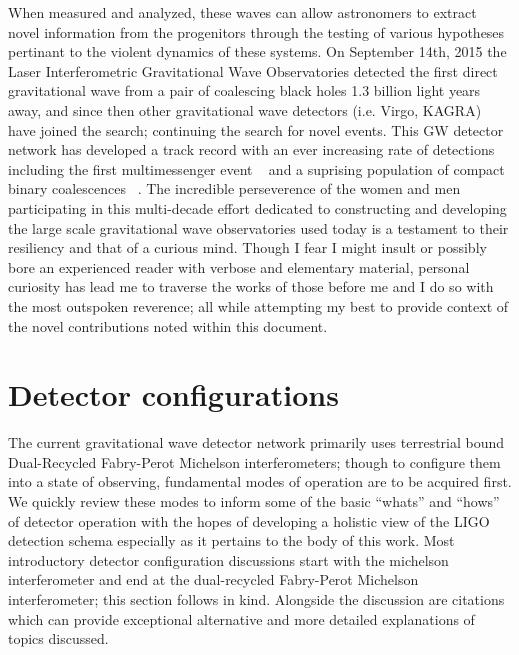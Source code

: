 When measured and analyzed, these waves can allow astronomers to extract novel information from the progenitors through the testing of various hypotheses pertinant to the violent dynamics of these systems. On September 14th, 2015 the Laser Interferometric Gravitational Wave Observatories detected the first direct gravitational wave from a pair of coalescing black holes 1.3 billion light years away, and since then other gravitational wave detectors (i.e. Virgo, KAGRA) have joined the search; continuing the search for novel events. This GW detector network has developed a track record with an ever increasing rate of detections including the first multimessenger event ~\cite{gw170817} and a suprising population of compact binary coalescences ~\cite{Nitz_2023}. The incredible perseverence of the women and men participating in this multi-decade effort dedicated to constructing and developing the large scale gravitational wave observatories used today is a testament to their resiliency and that of a curious mind. Though I fear I might insult or possibly bore an experienced reader with verbose and elementary material, personal curiosity has lead me to traverse the works of those before me and I do so with the most outspoken reverence; all while attempting my best to provide context of the novel contributions noted within this document. 

\newpage

\section{Detector configurations}
The current gravitational wave detector network primarily uses terrestrial bound Dual-Recycled Fabry-Perot Michelson interferometers; though to configure them into a state of observing, fundamental modes of operation are to be acquired first. We quickly review these modes to inform some of the basic ``whats'' and ``hows'' of detector operation with the hopes of developing a holistic view of the LIGO detection schema especially as it pertains to the body of this work. Most introductory detector configuration discussions start with the michelson interferometer and end at the dual-recycled Fabry-Perot Michelson interferometer; this section follows in kind. Alongside the discussion are citations which can provide exceptional alternative and more detailed explanations of topics discussed.

